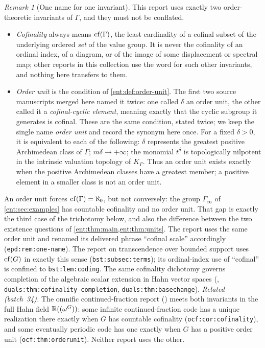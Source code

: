 \documentclass[11pt]{article}
\theoremstyle{plain}
\theoremstyle{plain}
\theoremstyle{plain}
\theoremstyle{definition}
\theoremstyle{definition}
\theoremstyle{definition}
\theoremstyle{definition}
\theoremstyle{remark}
\newtheorem{remark}[remark]{Remark}
\newcommand{\K}{K_\Gamma}\newcommand{\KD}{K_\Delta}
\begin{document}
\begin{remark}[One name for one invariant]\label{ent:rem:one-name}
This report uses exactly two order-theoretic invariants of $\Gamma$, and
they must not be conflated.
\begin{itemize}[leftmargin=1.4em]
\item \emph{Cofinality} always means $\operatorname{cf}(\Gamma)$, the least cardinality of
a cofinal subset of the underlying ordered \emph{set} of the value group. It
is never the cofinality of an ordinal index, of a diagram, or of the image of
some displacement or spectral map; other reports in this collection use the
word for such other invariants, and nothing here transfers to them.
\item \emph{Order unit} is the condition of
\cref{ent:def:order-unit}. The first two source manuscripts merged here named it
twice: one called $\delta$ an order unit, the other called it a
\emph{cofinal-cyclic element}, meaning exactly that the cyclic subgroup it
generates is cofinal. These are the same condition, stated twice; we keep
the single name \emph{order unit} and record the synonym here once.
For a fixed $\delta>0$, it is equivalent to each of the following:
$\delta$ represents the greatest positive Archimedean class of $\Gamma$;
$m\delta\to+\infty$; the monomial
$t^\delta$ is topologically nilpotent in the intrinsic valuation topology of
$\K$. Thus an order unit exists exactly when the positive Archimedean
classes have a greatest member; a positive element in a smaller class is
not an order unit.
\end{itemize}
An order unit forces $\operatorname{cf}(\Gamma)=\aleph_0$, but not conversely: the group
$\Gamma_\infty$ of \cref{ent:sec:examples} has countable cofinality and no
order unit. That gap is exactly the third case of the trichotomy below, and
also the difference between the two existence questions of
\cref{ent:thm:main,ent:thm:units}. The report
 uses the same order unit
and renamed its delivered phrase ``cofinal scale'' accordingly
(\texttt{epd:rem:one-name}). The report on transcendence over bounded support uses $\operatorname{cf}(G)$ in
exactly this sense (\texttt{bst:subsec:terms}); its ordinal-index use of
``cofinal'' is confined to \texttt{bst:lem:coding}. The same cofinality
dichotomy governs completion of the algebraic scalar extension in Hahn vector
spaces (,
\texttt{duals:thm:cofinality-completion}, \texttt{duals:thm:basechange}).
\emph{Related (batch~34).} The omnific continued-fraction report
() meets both invariants in
the full Hahn field $\mathbb R((\omega^G))$: some infinite continued-fraction code
has a unique realization there exactly when $G$ has countable cofinality
(\texttt{ocf:cor:cofinality}), and some eventually periodic code has one
exactly when $G$ has a positive order unit (\texttt{ocf:thm:orderunit}).
Neither report uses the other.
\end{remark}
\end{document}
